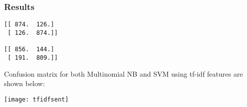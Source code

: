 \begin{frame}[fragile]\frametitle{Results}
    \begin{lstlisting}
[[ 874.  126.]
 [ 126.  874.]]
 
[[ 856.  144.]
 [ 191.  809.]]
    \end{lstlisting}
Confusion matrix for both Multinomial NB and SVM using tf-idf features are shown below:
  \begin{center}
\texttt{[image: tfidfsent]}
\end{center}
\end{frame}

